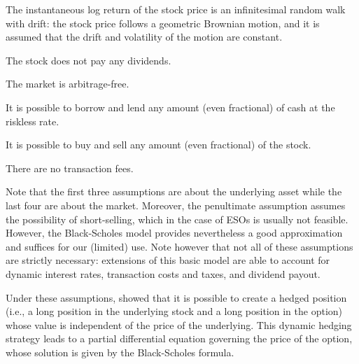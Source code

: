     \begin{assumption}
        \label{ass: bs_2}
        The instantaneous log return of the stock price is an infinitesimal random walk with drift: the stock price follows a geometric Brownian motion, and it is assumed that the drift and volatility of the motion are constant.
    \end{assumption}

    \begin{assumption}
        \label{ass:bs_3}
        The stock does not pay any dividends.
    \end{assumption}

    \begin{assumption}
        \label{ass:bs_4}
        The market is arbitrage-free.
    \end{assumption}

    \begin{assumption}
        \label{ass:bs_5}
        It is possible to borrow and lend any amount (even fractional) of cash at the riskless rate.
    \end{assumption}

    \begin{assumption}
        \label{ass:bs_6}
        It is possible to buy and sell any amount (even fractional) of the stock.
    \end{assumption}
    
    \begin{assumption}
        \label{ass:bs_7}
        There are no transaction fees.
    \end{assumption}
    
    Note that the first three assumptions are about the underlying asset while the last four are about the market. Moreover, the penultimate assumption assumes the possibility of short-selling, which in the case of ESOs is usually not feasible. However, the Black-Scholes model provides nevertheless a good approximation and suffices for our (limited) use. Note however that not all of these assumptions are strictly necessary: extensions of this basic model are able to account for dynamic interest rates, transaction costs and taxes, and dividend payout.  

    Under these assumptions, \cite{black1973pricing} showed that it is possible to create a hedged position (i.e., a long position in the underlying stock and a long position in the option) whose value is independent of the price of the underlying. This dynamic hedging strategy leads to a partial differential equation governing the price of the option, whose solution is given by the Black-Scholes formula.

